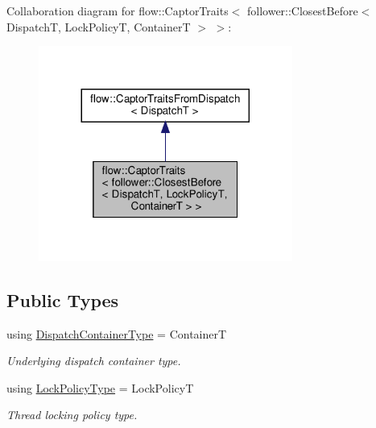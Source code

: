 Collaboration diagram for flow\+:\+:Captor\+Traits$<$ follower\+:\+:Closest\+Before$<$ DispatchT, Lock\+PolicyT, ContainerT $>$ $>$\+:
\nopagebreak
\begin{figure}[H]
\begin{center}
\leavevmode
\includegraphics[width=236pt]{structflow_1_1_captor_traits_3_01follower_1_1_closest_before_3_01_dispatch_t_00_01_lock_policy_t815795d897372abbaaec3ef029a3844b}
\end{center}
\end{figure}
\subsection*{Public Types}
\begin{DoxyCompactItemize}
\item 
\mbox{\label{structflow_1_1_captor_traits_3_01follower_1_1_closest_before_3_01_dispatch_t_00_01_lock_policy_t_00_01_container_t_01_4_01_4_ab9f9fba0070d9717af044499a344f6d5}} 
using \hyperlink{structflow_1_1_captor_traits_3_01follower_1_1_closest_before_3_01_dispatch_t_00_01_lock_policy_t_00_01_container_t_01_4_01_4_ab9f9fba0070d9717af044499a344f6d5}{Dispatch\+Container\+Type} = ContainerT
\begin{DoxyCompactList}\small\item\em Underlying dispatch container type. \end{DoxyCompactList}\item 
\mbox{\label{structflow_1_1_captor_traits_3_01follower_1_1_closest_before_3_01_dispatch_t_00_01_lock_policy_t_00_01_container_t_01_4_01_4_a720741fcfbd36cb3007b98cb11da5d47}} 
using \hyperlink{structflow_1_1_captor_traits_3_01follower_1_1_closest_before_3_01_dispatch_t_00_01_lock_policy_t_00_01_container_t_01_4_01_4_a720741fcfbd36cb3007b98cb11da5d47}{Lock\+Policy\+Type} = Lock\+PolicyT
\begin{DoxyCompactList}\small\item\em Thread locking policy type. \end{DoxyCompactList}\end{DoxyCompactItemize}


